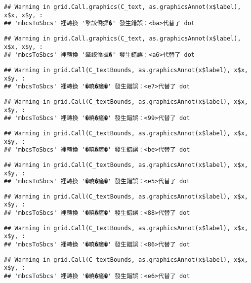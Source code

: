 \documentclass[
]{article}
\begin{document}
\begin{verbatim}
## Warning in grid.Call.graphics(C_text, as.graphicsAnnot(x$label), x$x, x$y, :
## 'mbcsToSbcs' 裡轉換 '摮詨僑摨�' 發生錯誤：<ba>代替了 dot
\end{verbatim}

\begin{verbatim}
## Warning in grid.Call.graphics(C_text, as.graphicsAnnot(x$label), x$x, x$y, :
## 'mbcsToSbcs' 裡轉換 '摮詨僑摨�' 發生錯誤：<a6>代替了 dot
\end{verbatim}

\begin{verbatim}
## Warning in grid.Call(C_textBounds, as.graphicsAnnot(x$label), x$x, x$y, :
## 'mbcsToSbcs' 裡轉換 '�曉�瘥�' 發生錯誤：<e7>代替了 dot
\end{verbatim}

\begin{verbatim}
## Warning in grid.Call(C_textBounds, as.graphicsAnnot(x$label), x$x, x$y, :
## 'mbcsToSbcs' 裡轉換 '�曉�瘥�' 發生錯誤：<99>代替了 dot
\end{verbatim}

\begin{verbatim}
## Warning in grid.Call(C_textBounds, as.graphicsAnnot(x$label), x$x, x$y, :
## 'mbcsToSbcs' 裡轉換 '�曉�瘥�' 發生錯誤：<be>代替了 dot
\end{verbatim}

\begin{verbatim}
## Warning in grid.Call(C_textBounds, as.graphicsAnnot(x$label), x$x, x$y, :
## 'mbcsToSbcs' 裡轉換 '�曉�瘥�' 發生錯誤：<e5>代替了 dot
\end{verbatim}

\begin{verbatim}
## Warning in grid.Call(C_textBounds, as.graphicsAnnot(x$label), x$x, x$y, :
## 'mbcsToSbcs' 裡轉換 '�曉�瘥�' 發生錯誤：<88>代替了 dot
\end{verbatim}

\begin{verbatim}
## Warning in grid.Call(C_textBounds, as.graphicsAnnot(x$label), x$x, x$y, :
## 'mbcsToSbcs' 裡轉換 '�曉�瘥�' 發生錯誤：<86>代替了 dot
\end{verbatim}

\begin{verbatim}
## Warning in grid.Call(C_textBounds, as.graphicsAnnot(x$label), x$x, x$y, :
## 'mbcsToSbcs' 裡轉換 '�曉�瘥�' 發生錯誤：<e6>代替了 dot
\end{verbatim}
\end{document}
